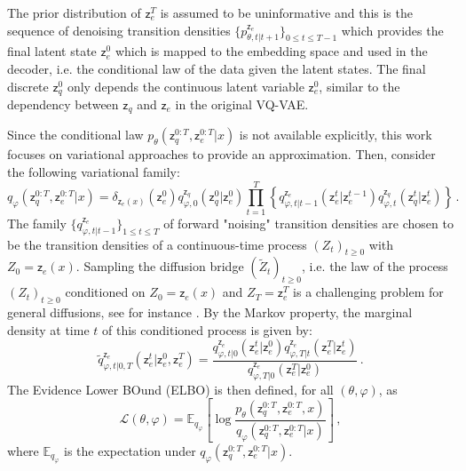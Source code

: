 \documentclass{article}
\theoremstyle{plain}
\theoremstyle{definition}
\theoremstyle{remark}
\newcommand{\latentcont}{\mathsf{z}_e}
\newcommand{\latentdis}{\mathsf{z}_q}
\newcommand{\bckw}{\tilde{q}}
\begin{document}
The prior distribution of  $\latentcont^T$ is assumed to be uninformative and this is the sequence of denoising transition densities $\{p^{\latentcont}_{\theta,t|t+1}\}_{0\leqslant t\leqslant T-1}$ which provides the final latent state $\latentcont^0$ which is mapped to the embedding space and used in the decoder, i.e. the conditional law of the data given the latent states. The final discrete $\latentdis^0$ only depends the continuous latent variable  $\latentcont^0$, similar to the dependency between $\latentdis$ and $\latentcont$ in the original VQ-VAE.

Since the conditional law $p_{\theta}(\latentdis^{0:T},\latentcont^{0:T}| x)$ is not available explicitly, this work focuses on  variational approaches to provide an approximation. Then, consider the following variational family:
$$
q_{\varphi}(\latentdis^{0:T},\latentcont^{0:T}| x) = \delta_{\latentcont(x)}(\latentcont^0)q_{\varphi,0}^{\latentdis}(\latentdis^0|\latentcont^0)\prod_{t=1}^T\left\{ q^{\latentcont}_{\varphi,t|t-1}(\latentcont^t|\latentcont^{t-1})q^{\latentdis}_{\varphi,t}(\latentdis^t|\latentcont^t)\right\}\,.
$$
The family $\{q^{\latentcont}_{\varphi,t|t-1}\}_{1\leqslant t \leqslant T}$  of forward "noising" transition densities are chosen to be the transition densities of a continuous-time process $(Z_t)_{t\geqslant 0}$ with $Z_0 = \latentcont(x)$. Sampling the diffusion bridge $(\tilde Z_t)_{t\geqslant 0}$, i.e. the law of the process $(Z_t)_{t\geqslant 0}$  conditioned on $Z_0 = \latentcont(x)$ and $Z_T = \latentcont^T$ is a challenging problem for general diffusions, see for instance \cite{beskos2008mcmc,lin2010generating,bladt2016simulation}. By the Markov property, the  marginal density at time $t$ of this conditioned process is given by:
\begin{equation}
\label{eq:markov:bridge}
\bckw^{\latentcont}_{\varphi,t|0,T}(\latentcont^t|\latentcont^0,\latentcont^T) = \frac{q^{\latentcont}_{\varphi,t|0}(\latentcont^t|\latentcont^{0})q^{\latentcont}_{\varphi,T|t}(\latentcont^T|\latentcont^{t})}{q^{\latentcont}_{\varphi,T|0}(\latentcont^T|\latentcont^{0})}\,.
\end{equation}
The Evidence Lower BOund (ELBO) is then defined, for all $(\theta,\varphi)$, as
$$
\mathcal{L}(\theta,\varphi) = \mathbb{E}_{q_{\varphi}}\left[\log \frac{p_{\theta}(\latentdis^{0:T},\latentcont^{0:T},x)}{q_{\varphi}(\latentdis^{0:T},\latentcont^{0:T}| x)}\right]\,,
$$
where $\mathbb{E}_{q_{\varphi}}$ is the expectation under $q_{\varphi}(\latentdis^{0:T},\latentcont^{0:T}| x)$.
\end{document}
